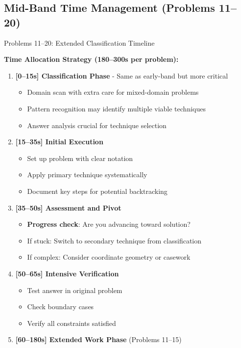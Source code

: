 \documentclass{article}
\begin{document}
\subsection{Mid-Band Time Management (Problems 11--20)}

\begin{timebox}{Problems 11--20: Extended Classification Timeline}

\textbf{Time Allocation Strategy (180--300s per problem):}
\begin{enumerate}
\item \textbf{[0--15s] Classification Phase} - Same as early-band but more critical
   \begin{itemize}
   \item Domain scan with extra care for mixed-domain problems
   \item Pattern recognition may identify multiple viable techniques
   \item Answer analysis crucial for technique selection
   \end{itemize}
\item \textbf{[15--35s] Initial Execution}
   \begin{itemize}
   \item Set up problem with clear notation
   \item Apply primary technique systematically
   \item Document key steps for potential backtracking
   \end{itemize}
\item \textbf{[35--50s] Assessment and Pivot}
   \begin{itemize}
   \item \textbf{Progress check}: Are you advancing toward solution?
   \item If stuck: Switch to secondary technique from classification
   \item If complex: Consider coordinate geometry or casework
   \end{itemize}
\item \textbf{[50--65s] Intensive Verification}
   \begin{itemize}
   \item Test answer in original problem
   \item Check boundary cases
   \item Verify all constraints satisfied
   \end{itemize}
\item \textbf{[60--180s] Extended Work Phase} (Problems 11--15)

\end{enumerate}
\end{timebox}
\end{document}
